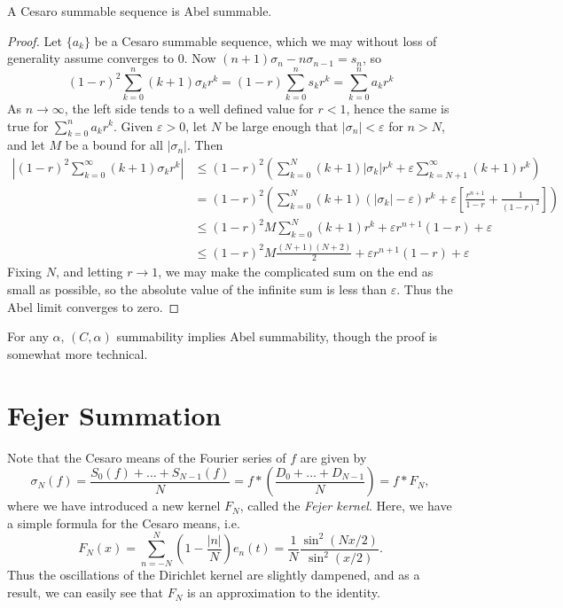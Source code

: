 \begin{theorem}
    A Cesaro summable sequence is Abel summable.
\end{theorem}
\begin{proof}
    Let $\{ a_k \}$ be a Cesaro summable sequence, which we may without loss of generality assume converges to $0$. Now $(n + 1)\sigma_n - n \sigma_{n-1} = s_n$, so
    \[ (1 - r)^2 \sum_{k = 0}^n (k + 1) \sigma_k r^k = (1 - r) \sum_{k = 0}^n s_k r^k = \sum_{k = 0}^n a_k r^k \]
    As $n \to \infty$, the left side tends to a well defined value for $r < 1$, hence the same is true for $\sum_{k = 0}^n a_k r^k$. Given $\varepsilon > 0$, let $N$ be large enough that $|\sigma_n| < \varepsilon$ for $n > N$, and let $M$ be a bound for all $|\sigma_n|$. Then
    \begin{align*}
        \left| (1 - r)^2 \sum_{k = 0}^\infty (k + 1) \sigma_k r^k \right| &\leq (1 - r)^2 \left( \sum_{k = 0}^N (k + 1) |\sigma_k| r^k + \varepsilon \sum_{k = N+1}^\infty (k + 1) r^k \right)\\
        &= (1 - r)^2 \left( \sum_{k = 0}^N (k + 1) (|\sigma_k| - \varepsilon) r^k + \varepsilon \left[ \frac{r^{n+1}}{1-r} + \frac{1}{(1 - r)^2} \right] \right)\\
        &\leq (1 - r)^2 M \sum_{k = 0}^N (k + 1) r^k + \varepsilon r^{n+1} (1 - r) + \varepsilon\\
        &\leq (1 - r)^2 M \frac{(N+1)(N+2)}{2} + \varepsilon r^{n+1} (1 - r) + \varepsilon
    \end{align*}
    Fixing $N$, and letting $r \to 1$, we may make the complicated sum on the end as small as possible, so the absolute value of the infinite sum is less than $\varepsilon$. Thus the Abel limit converges to zero.
\end{proof}

\begin{remark}
    For any $\alpha$, $(C,\alpha)$ summability implies Abel summability, though the proof is somewhat more technical.
\end{remark}

\section{Fejer Summation}

Note that the Cesaro means of the Fourier series of $f$ are given by
%
\[ \sigma_N(f) = \frac{S_0(f) + \dots + S_{N-1}(f)}{N} = f * \left( \frac{D_0 + \dots + D_{N-1}}{N} \right) = f * F_N, \]
%
where we have introduced a new kernel $F_N$, called the \emph{Fejer kernel}. Here, we have a simple formula for the Cesaro means, i.e.
%
\[ F_N(x) = \sum_{n = -N}^N \left( 1 - \frac{|n|}{N} \right) e_n(t) = \frac{1}{N} \frac{\sin^2(Nx/2)}{\sin^2(x/2)}. \]
%
Thus the oscillations of the Dirichlet kernel are slightly dampened, and as a result, we can easily see that $F_N$ is an approximation to the identity.

